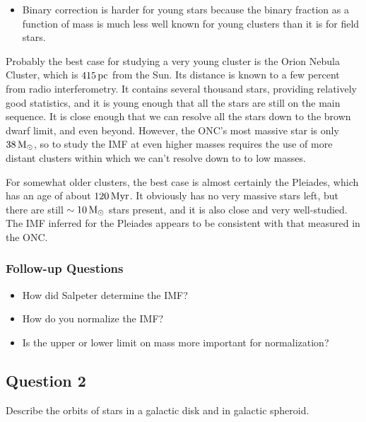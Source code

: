 \documentclass[a4paper,10pt]{article}
\begin{document}
\begin{itemize}
    \item Binary correction is harder for young stars because the binary fraction as a function of mass is much less well known for young clusters than it is for field stars.
\end{itemize}

{\noindent}Probably the best case for studying a very young cluster is the Orion Nebula Cluster, which is $415\,{\rm pc}$ from the Sun. Its distance is known to a few percent from radio interferometry. It contains several thousand stars, providing relatively good statistics, and it is young enough that all the stars are still on the main sequence. It is close enough that we can resolve all the stars down to the brown dwarf limit, and even beyond. However, the ONC's most massive star is only $38\,{\rm M_\odot}$, so to study the IMF at even higher masses requires the use of more distant clusters within which we can't resolve down to to low masses.

{\noindent}For somewhat older clusters, the best case is almost certainly the Pleiades, which has an age of about $120\,{\rm Myr}$. It obviously has no very massive stars left, but there are still $\sim10\,{\rm M_\odot}$ stars present, and it is also close and very well-studied. The IMF inferred for the Pleiades appears to be consistent with that measured in the ONC.

\subsubsection{Follow-up Questions}

\begin{itemize}
    \item How did Salpeter determine the IMF?
    \item How do you normalize the IMF?
    \item Is the upper or lower limit on mass more important for normalization?
\end{itemize}


\newpage
\subsection{Question 2}

Describe the orbits of stars in a galactic disk and in galactic spheroid.
\end{document}
